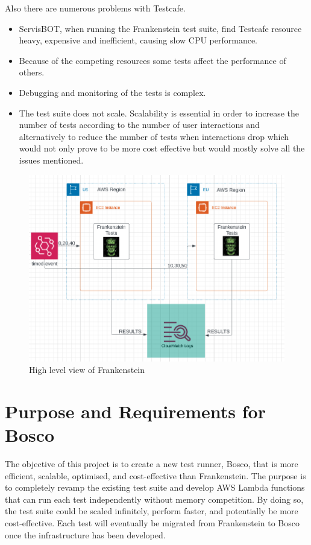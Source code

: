 \documentclass[12pt,a4paper,titlepage]{report}
\begin{document}
Also there are numerous problems with Testcafe. 
\begin{itemize}
 \item ServisBOT, when running the Frankenstein test suite, find Testcafe resource heavy, expensive and inefficient, causing slow CPU performance. 
 \item Because of the competing resources some tests affect the performance of others. 
 \item Debugging and monitoring of the tests is complex.
 \item The test suite does not scale. Scalability is essential in order to increase the number of tests according to the number of user interactions and alternatively to reduce the number of tests when interactions drop which would not only prove to be more cost effective but would mostly solve all the issues mentioned.
\end{itemize}

 \begin{figure}[ht]
  \centering
  \includegraphics[width=\textwidth,height=\textheight,keepaspectratio]{./diagrams/frank_high_level.png}
  \caption{High level view of Frankenstein}
 \end{figure}
 \clearpage

\section{Purpose and Requirements for Bosco}

The objective of this project is to create a new test runner, Bosco, that is more efficient, scalable, optimised, and cost-effective than Frankenstein. 
The purpose is to completely revamp the existing test suite and develop AWS Lambda functions that can run each test independently without memory competition. 
By doing so, the test suite could be scaled infinitely, perform faster, and potentially be more cost-effective. 
Each test will eventually be migrated from Frankenstein to Bosco once the infrastructure has been developed.
\end{document}

